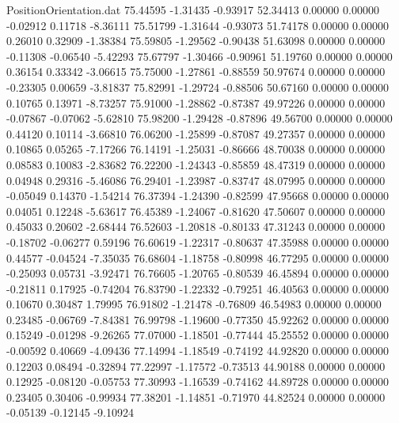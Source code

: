 \begin{filecontents}{PositionOrientation.dat}
  75.44595   -1.31435   -0.93917    52.34413    0.00000    0.00000   -0.02912    0.11718   -8.36111
  75.51799   -1.31644   -0.93073    51.74178    0.00000    0.00000    0.26010    0.32909   -1.38384
  75.59805   -1.29562   -0.90438    51.63098    0.00000    0.00000   -0.11308   -0.06540   -5.42293
  75.67797   -1.30466   -0.90961    51.19760    0.00000    0.00000    0.36154    0.33342   -3.06615
  75.75000   -1.27861   -0.88559    50.97674    0.00000    0.00000   -0.23305    0.00659   -3.81837
  75.82991   -1.29724   -0.88506    50.67160    0.00000    0.00000    0.10765    0.13971   -8.73257
  75.91000   -1.28862   -0.87387    49.97226    0.00000    0.00000   -0.07867   -0.07062   -5.62810
  75.98200   -1.29428   -0.87896    49.56700    0.00000    0.00000    0.44120    0.10114   -3.66810
  76.06200   -1.25899   -0.87087    49.27357    0.00000    0.00000    0.10865    0.05265   -7.17266
  76.14191   -1.25031   -0.86666    48.70038    0.00000    0.00000    0.08583    0.10083   -2.83682
  76.22200   -1.24343   -0.85859    48.47319    0.00000    0.00000    0.04948    0.29316   -5.46086
  76.29401   -1.23987   -0.83747    48.07995    0.00000    0.00000   -0.05049    0.14370   -1.54214
  76.37394   -1.24390   -0.82599    47.95668    0.00000    0.00000    0.04051    0.12248   -5.63617
  76.45389   -1.24067   -0.81620    47.50607    0.00000    0.00000    0.45033    0.20602   -2.68444
  76.52603   -1.20818   -0.80133    47.31243    0.00000    0.00000   -0.18702   -0.06277    0.59196
  76.60619   -1.22317   -0.80637    47.35988    0.00000    0.00000    0.44577   -0.04524   -7.35035
  76.68604   -1.18758   -0.80998    46.77295    0.00000    0.00000   -0.25093    0.05731   -3.92471
  76.76605   -1.20765   -0.80539    46.45894    0.00000    0.00000   -0.21811    0.17925   -0.74204
  76.83790   -1.22332   -0.79251    46.40563    0.00000    0.00000    0.10670    0.30487    1.79995
  76.91802   -1.21478   -0.76809    46.54983    0.00000    0.00000    0.23485   -0.06769   -7.84381
  76.99798   -1.19600   -0.77350    45.92262    0.00000    0.00000    0.15249   -0.01298   -9.26265
  77.07000   -1.18501   -0.77444    45.25552    0.00000    0.00000   -0.00592    0.40669   -4.09436
  77.14994   -1.18549   -0.74192    44.92820    0.00000    0.00000    0.12203    0.08494   -0.32894
  77.22997   -1.17572   -0.73513    44.90188    0.00000    0.00000    0.12925   -0.08120   -0.05753
  77.30993   -1.16539   -0.74162    44.89728    0.00000    0.00000    0.23405    0.30406   -0.99934
  77.38201   -1.14851   -0.71970    44.82524    0.00000    0.00000   -0.05139   -0.12145   -9.10924

\end{filecontents}
